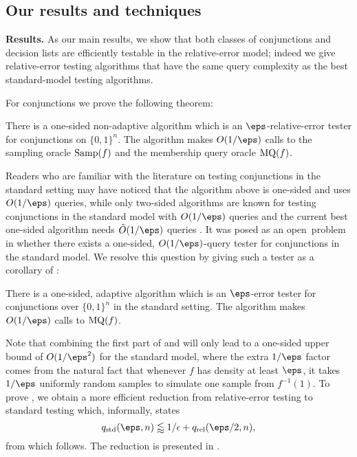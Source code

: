 \documentclass[11pt]{article}
\theoremstyle{definition}
\begin{document}
\subsection{Our results and techniques}\label{sec:results-techniques}

{\bf Results.} As our main results, we show that both classes of conjunctions and decision lists are efficiently testable in the 
  relative-error model; indeed we give relative-error
testing algorithms that have the same query complexity as the best standard-model testing algorithms. 

For conjunctions we prove the following theorem:

\begin{theorem} \label{thm:conjunction}
There is a one-sided non-adaptive
algorithm which is an $\eps$-relative-error tester for conjunctions on $\{0,1\}^n$. The algorithm makes $O(1/\eps)$ calls to the sampling oracle $\mathrm{Samp}(f)$ and the membership query oracle $\mathrm{MQ}(f)$. 
\end{theorem}



Readers who are familiar with the literature on testing conjunctions in the standard setting   may have noticed that the algorithm above is one-sided and uses $O(1/\eps)$ queries, while only two-sided algorithms are known for testing conjunctions in the standard model
with $O(1/\eps)$ queries \cite{PRS02} and the current best 
one-sided algorithm needs $\tilde{O}(1/\eps)$ queries \cite{GoldreichRon20}. 
It was posed as an open~problem in \cite{Bshouty20}  whether 
  there exists a one-sided, $O(1/\eps)$-query tester for conjunctions in the standard model.
We resolve this question by giving such a tester as a corollary of :

\begin{theorem}\label{thm:conjunction-standard}
    There is a one-sided, adaptive
algorithm which is an $\eps$-error tester for conjunctions  over $\{0,1\}^n$ in the standard setting. The algorithm makes $O(1/\eps)$ calls to $\mathrm{MQ}(f)$. 
\end{theorem}



Note that combining the first part of  and 
   will only lead to a one-sided upper bound
  of $O(1/\eps^2)$ for the standard model, where the extra $1/\eps$ factor comes from the natural fact that whenever $f$ has density at least $\eps$, it takes $1/\eps$ uniformly random samples to simulate one sample from $f^{-1}(1)$.
To prove , we obtain a more 
  efficient reduction from relative-error testing to 
  standard testing which, informally, states 
\begin{equation}\label{heeh6}
q_{\textrm{std}}(\eps,n)\lessapprox {1/\epsilon} + q_{\text{rel}}(\eps/2,n),
\end{equation} 
from which  follows.
The reduction is presented in .
\end{document}
